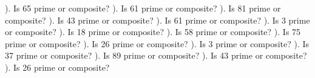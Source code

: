 \documentclass{article}%
\begin{document}
). Is 65 prime or composite?%
\newline%
\newline%
). Is 61 prime or composite?%
\newline%
\newline%
). Is 81 prime or composite?%
\newline%
\newline%
). Is 43 prime or composite?%
\newline%
\newline%
). Is 61 prime or composite?%
\newline%
\newline%
). Is 3 prime or composite?%
\newline%
\newline%
). Is 18 prime or composite?%
\newline%
\newline%
). Is 58 prime or composite?%
\newline%
\newline%
). Is 75 prime or composite?%
\newline%
\newline%
). Is 26 prime or composite?%
\newline%
\newline%
). Is 3 prime or composite?%
\newline%
\newline%
). Is 37 prime or composite?%
\newline%
\newline%
). Is 89 prime or composite?%
\newline%
\newline%
). Is 43 prime or composite?%
\newline%
\newline%
). Is 26 prime or composite?%
\end{document}
